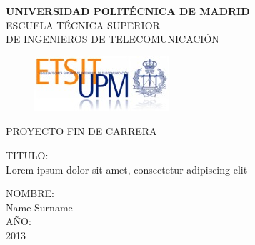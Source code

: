 \begin{center}
\thispagestyle{empty}
\textbf{\Large UNIVERSIDAD POLIT\'{E}CNICA DE MADRID}\\
\vspace*{1cm}
\large ESCUELA T\'{E}CNICA SUPERIOR\\DE INGENIEROS DE TELECOMUNICACI\'{O}N\\

\begin{figure}[h]
\centering
\includegraphics[scale=4]{./etsitlogo.jpg}
\end{figure}

\Large PROYECTO FIN DE CARRERA

\vspace*{2cm}
\Large TITULO:\\
\large Lorem ipsum dolor sit amet, consectetur adipiscing elit

\vspace*{5cm}
\Large NOMBRE:\\
\large Name Surname\\
\vspace*{1cm}
\Large A\~{N}O:\\
\large 2013
\end{center}

\pagebreak

\newpage
\thispagestyle{empty}
\mbox{}
\pagebreak
